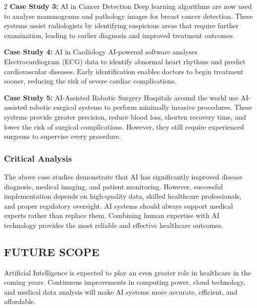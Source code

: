 \begin{multicols}{2}
\noindent
\textbf{Case Study 3:} AI in Cancer Detection
Deep learning algorithms are now used to analyse mammograms and pathology images for breast cancer detection. These systems assist radiologists by identifying suspicious areas that require further examination, leading to earlier diagnosis and improved treatment outcomes.

\noindent
\textbf{Case Study 4:} AI in Cardiology
AI-powered software analyses Electrocardiogram (ECG) data to identify abnormal heart rhythms and predict cardiovascular diseases. Early identification enables doctors to begin treatment sooner, reducing the risk of severe cardiac complications.

\noindent
\textbf{Case Study 5:} AI-Assisted Robotic Surgery
Hospitals around the world use AI-assisted robotic surgical systems to perform minimally invasive procedures. These systems provide greater precision, reduce blood loss, shorten recovery time, and lower the risk of surgical complications. However, they still require experienced surgeons to supervise every procedure.

\subsubsection*{Critical Analysis}
The above case studies demonstrate that AI has significantly improved disease diagnosis, medical imaging, and patient monitoring. However, successful implementation depends on high-quality data, skilled healthcare professionals, and proper regulatory oversight. AI systems should always support medical experts rather than replace them. Combining human expertise with AI technology provides the most reliable and effective healthcare outcomes.

\subsection*{\centering\uppercase{Future Scope}}
Artificial Intelligence is expected to play an even greater role in healthcare in the coming years. Continuous improvements in computing power, cloud technology, and medical data analysis will make AI systems more accurate, efficient, and affordable.


\end{multicols}

